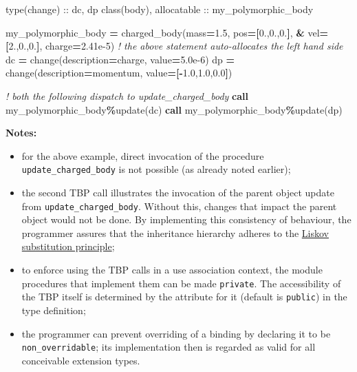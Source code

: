 \documentclass[
  paper=a4,
  ,captions=tableheading
]{scrartcl}
\newenvironment{Shaded}{\begin{snugshade}}{\end{snugshade}}
\newcommand{\CommentTok}[1]{\textcolor[rgb]{0.56,0.35,0.01}{\textit{#1}}}
\newcommand{\DataTypeTok}[1]{\textcolor[rgb]{0.13,0.29,0.53}{#1}}
\newcommand{\FloatTok}[1]{\textcolor[rgb]{0.00,0.00,0.81}{#1}}
\newcommand{\KeywordTok}[1]{\textcolor[rgb]{0.13,0.29,0.53}{\textbf{#1}}}
\newcommand{\NormalTok}[1]{#1}
\newcommand{\OperatorTok}[1]{\textcolor[rgb]{0.81,0.36,0.00}{\textbf{#1}}}
\newcommand{\StringTok}[1]{\textcolor[rgb]{0.31,0.60,0.02}{#1}}
\providecommand{\tightlist}{%
  \setlength{\itemsep}{0pt}\setlength{\parskip}{0pt}}
\begin{document}
\begin{Shaded}
\begin{Highlighting}[]
\DataTypeTok{type(change)} \DataTypeTok{::}\NormalTok{  dc, dp}
\DataTypeTok{class(body)}\NormalTok{, }\DataTypeTok{allocatable} \DataTypeTok{::}\NormalTok{ my\_polymorphic\_body}

\NormalTok{my\_polymorphic\_body }\KeywordTok{=}\NormalTok{ charged\_body(mass}\KeywordTok{=}\FloatTok{1.5}\NormalTok{, pos}\KeywordTok{=[}\FloatTok{0.}\NormalTok{,}\FloatTok{0.}\NormalTok{,}\FloatTok{0.}\KeywordTok{]}\NormalTok{, }\KeywordTok{\&}
\NormalTok{                                   vel}\KeywordTok{=[}\FloatTok{2.}\NormalTok{,}\FloatTok{0.}\NormalTok{,}\FloatTok{0.}\KeywordTok{]}\NormalTok{, charge}\KeywordTok{=}\FloatTok{2.41e{-}5}\NormalTok{)}
\CommentTok{! the above statement auto{-}allocates the left hand side}
\NormalTok{dc }\KeywordTok{=}\NormalTok{ change(description}\KeywordTok{=}\StringTok{\textquotesingle{}charge\textquotesingle{}}\NormalTok{, }\DataTypeTok{value}\KeywordTok{=}\FloatTok{5.0e{-}6}\NormalTok{)}
\NormalTok{dp }\KeywordTok{=}\NormalTok{ change(description}\KeywordTok{=}\StringTok{\textquotesingle{}momentum\textquotesingle{}}\NormalTok{, }\DataTypeTok{value}\KeywordTok{=[{-}}\FloatTok{1.0}\NormalTok{,}\FloatTok{1.0}\NormalTok{,}\FloatTok{0.0}\KeywordTok{]}\NormalTok{)}

\CommentTok{! both the following dispatch to update\_charged\_body}
\KeywordTok{call}\NormalTok{ my\_polymorphic\_body}\OperatorTok{\%}\NormalTok{update(dc)}
\KeywordTok{call}\NormalTok{ my\_polymorphic\_body}\OperatorTok{\%}\NormalTok{update(dp)}
\end{Highlighting}
\end{Shaded}

\textbf{Notes:}

\begin{itemize}
\tightlist
\item
  for the above example, direct invocation of the procedure
  \texttt{update\_charged\_body} is not possible (as already noted
  earlier);
\item
  the second TBP call illustrates the invocation of the parent object
  update from \texttt{update\_charged\_body}. Without this, changes that
  impact the parent object would not be done. By implementing this
  consistency of behaviour, the programmer assures that the inheritance
  hierarchy adheres to the
  \href{https://en.wikipedia.org/wiki/Liskov_substitution_principle}{Liskov
  substitution principle};
\item
  to enforce using the TBP calls in a use association context, the
  module procedures that implement them can be made \texttt{private}.
  The accessibility of the TBP itself is determined by the attribute for
  it (default is \texttt{public}) in the type definition;
\item
  the programmer can prevent overriding of a binding by declaring it to
  be \texttt{non\_overridable}; its implementation then is regarded as
  valid for all conceivable extension types.
\end{itemize}
\end{document}
